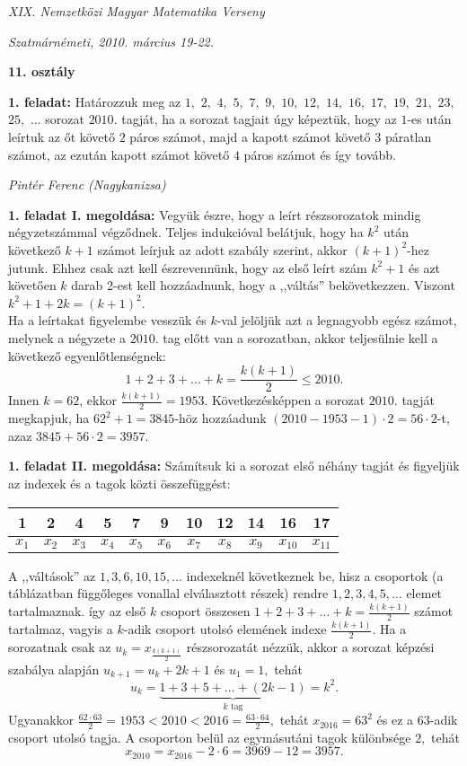 \documentclass[a4paper,10pt]{article}
\def\ki#1#2{\hfill {\it #1 (#2)}\medskip}
\begin{document}
\begin{center} \Large {\em XIX. Nemzetközi Magyar Matematika Verseny} \end{center}
\begin{center} \large{\em Szatmárnémeti, 2010. március 19-22.} \end{center}
\smallskip
\begin{center} \large{\bf 11. osztály} \end{center}
\bigskip 

{\bf 1. feladat: } Határozzuk meg az $1,$ $2,$ $4,$ $5,$ $7,$ $9,$ $10,$ $12,$ $14,$
$16,$ $17,$ $19,$ $21,$ $23,$ $25,$ $\ldots$ sorozat $2010.$ tagját,
ha a sorozat tagjait úgy képeztük, hogy az $1$-es után leírtuk az őt
követő $2$ páros számot, majd a kapott számot követő $3$ páratlan
számot, az ezután kapott számot követő $4$ páros számot és így
tovább.

\ki{Pintér Ferenc}{Nagykanizsa}\medskip

\textbf{1. feladat I. megoldása: } Vegyük észre, hogy a leírt részsorozatok mindig négy\-zetszámmal végződnek. Teljes indukcióval belátjuk,
hogy ha $k^2$ után következő $k+1$ számot leírjuk az adott szabály
szerint, akkor $(k+1)^2$-hez jutunk. Ehhez csak azt kell
észrevennünk,
 hogy az első leírt szám $k^2+1$ és azt követően $k$ darab 2-est kell hozzáadnunk, hogy a ,,váltás'' bekövetkezzen.
Viszont $k^2+1+2k=(k+1)^2$.\\
Ha a leírtakat figyelembe vesszük és $k$-val jelöljük azt a
leg\-na\-gyobb egész számot, melynek a négyzete a $2010.$ tag el\H
ott van a sorozatban, akkor teljesülnie kell a következő
egyenlőtlenségnek:
$$1+2+3+\dots+k=\frac{k(k+1)}{2}\leq 2010.$$
Innen $k=62$, ekkor $\frac{k(k+1)}{2}=1953$. Következésképpen a
sorozat $2010.$ tagját megkapjuk, ha $62^2+1=3845$-höz hozzáadunk
 $(2010-1953-1)\cdot2=56\cdot2$-t, azaz
$3845+56\cdot2=3957$.

\medskip

\textbf{1. feladat II. megoldása: } Számítsuk ki a sorozat
első néhány tagját és figyeljük  az indexek és a
tagok közti összefüggést:
\begin{center}
\begin{tabular}{c|cc|ccc|cccc|c}
1&2&4&5&7&9&10&12&14&16&17\\
\hline
$x_1$&$x_2$&$x_3$&$x_4$&$x_5$&$x_6$&$x_7$&$x_8$&$x_9$&$x_{10}$&$x_{11}$
\end{tabular}
\end{center}
A ,,váltások'' az $1,3,6,10,15,\ldots$ indexeknél
következnek be, hisz a csoportok (a táblázatban függ\H
oleges vonallal elválasztott részek) rendre  $1,2,3,4,5,\ldots$
elemet tartalmaznak. így az első $k$ csoport összesen
$1+2+3+\ldots +k=\frac{k(k+1)}{2}$ számot tartalmaz, vagyis a
$k$-adik csoport utolsó elemének indexe $\frac{k(k+1)}{2}.$ Ha a
sorozatnak csak az $u_k=x_{\frac{k(k+1)}{2}}$ részsorozatát
nézzük, akkor a sorozat képzési szabálya alapján
$u_{k+1}=u_k+2k+1$ és $u_1=1,$ tehát
$$u_k=\underbrace{1+3+5+\ldots +(2k-1)}_{k \mbox{ tag}}=k^2.$$
Ugyanakkor $\frac{62\cdot 63}{2}=1953<2010<2016=\frac{63\cdot
64}{2},$ tehát $x_{2016}=63^2$ és ez a $63$-adik csoport
utolsó tagja. A csoporton belül az egymásutáni tagok
különbsége $2,$ tehát
$$x_{2010}=x_{2016}-2\cdot 6=3969-12=3957.$$
\end{document}
